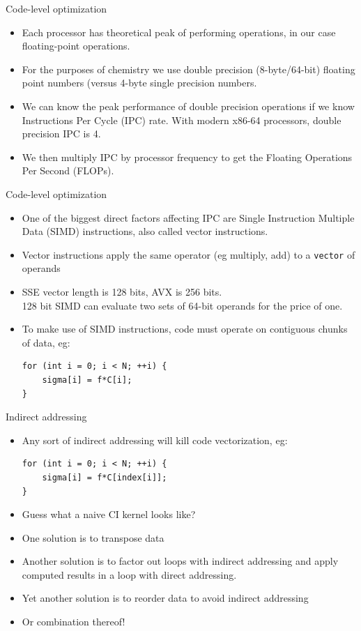 \documentclass{beamer}
\begin{document}
\begin{frame}{Code-level optimization}
\begin{itemize}
\item Each processor has theoretical peak of performing operations,
  in our case floating-point operations.
\item For the purposes of chemistry we use double precision (8-byte/64-bit) floating point numbers (versus 4-byte single precision numbers.
\item We can know the peak performance of double precision operations if we know Instructions Per Cycle (IPC) rate. With modern x86-64 processors, double precision IPC is 4.
\item We then multiply IPC by processor frequency to get the Floating Operations Per Second (FLOPs). 
\end{itemize}
\end{frame}

\begin{frame}[fragile]{Code-level optimization}
\begin{itemize}
\item One of the biggest direct factors affecting IPC are
  Single Instruction Multiple Data (SIMD) instructions, also called vector instructions.
\item Vector instructions apply the same operator (eg multiply, add) to a {\tt vector} of operands
\item SSE vector length is 128 bits, AVX is 256 bits. \\
  128 bit SIMD can evaluate two sets of 64-bit operands for the price of one.
\item To make use of SIMD instructions, code must operate on contiguous chunks of data, eg: \\
\begin{verbatim}
for (int i = 0; i < N; ++i) {
    sigma[i] = f*C[i];
}
\end{verbatim}
\end{itemize}
\end{frame}

\begin{frame}[fragile]{Indirect addressing}
\begin{itemize}

\item Any sort of indirect addressing will kill code vectorization, eg:
\begin{verbatim}
for (int i = 0; i < N; ++i) {
    sigma[i] = f*C[index[i]];
}
\end{verbatim}
\item Guess what a naive CI kernel looks like?
\item One solution is to transpose data
\item Another solution is to factor out loops with indirect addressing
  and apply computed results in a loop with direct addressing.
\item Yet another solution is to reorder data to avoid indirect addressing
\item Or combination thereof!
\end{itemize}
\end{frame}
\end{document}
